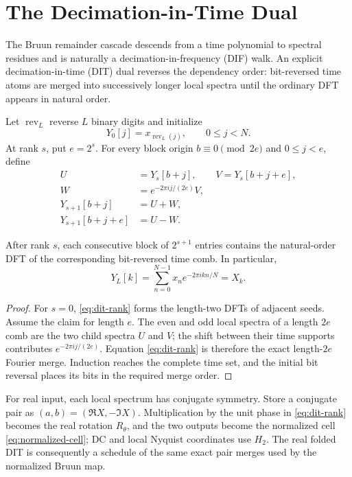 \section{The Decimation-in-Time Dual}
\label{sec:dit}

The Bruun remainder cascade descends from a time polynomial to spectral
residues and is naturally a decimation-in-frequency (DIF) walk.  An explicit
decimation-in-time (DIT) dual reverses the dependency order: bit-reversed time
atoms are merged into successively longer local spectra until the ordinary DFT
appears in natural order.

Let $\operatorname{rev}_L$ reverse $L$ binary digits and initialize
\begin{equation}
 Y_0[j]=x_{\operatorname{rev}_L(j)},\qquad0\le j<N.
 \label{eq:dit-seed}
\end{equation}
At rank $s$, put $e=2^s$.  For every block origin
$b\equiv0\pmod{2e}$ and $0\le j<e$, define
\begin{align}
 U&=Y_s[b+j],\qquad V=Y_s[b+j+e],\\
 W&=e^{-2\pi i j/(2e)}V,\nonumber\\
 Y_{s+1}[b+j]&=U+W,\\
 Y_{s+1}[b+j+e]&=U-W.
 \label{eq:dit-rank}
\end{align}

\begin{theorem}
After rank $s$, each consecutive block of $2^{s+1}$ entries contains the
natural-order DFT of the corresponding bit-reversed time comb.  In particular,
\begin{equation}
 Y_L[k]=\sum_{n=0}^{N-1}x_ne^{-2\pi ikn/N}=X_k.
 \label{eq:dit-terminal}
\end{equation}
\end{theorem}
\begin{proof}
For $s=0$, \eqref{eq:dit-rank} forms the length-two DFTs of adjacent seeds.
Assume the claim for length $e$.  The even and odd local spectra of a length
$2e$ comb are the two child spectra $U$ and $V$; the shift between their time
supports contributes $e^{-2\pi ij/(2e)}$.  Equation \eqref{eq:dit-rank} is
therefore the exact length-$2e$ Fourier merge.  Induction reaches the complete
time set, and the initial bit reversal places its bits in the required merge
order.
\end{proof}

For real input, each local spectrum has conjugate symmetry.  Store a conjugate
pair as $(a,b)=(\Re X,-\Im X)$.  Multiplication by the unit phase in
\eqref{eq:dit-rank} becomes the real rotation $R_\theta$, and the two outputs
become the normalized cell \eqref{eq:normalized-cell}; DC and local Nyquist
coordinates use $H_2$.  The real folded DIT is consequently a schedule of the
same exact pair merges used by the normalized Bruun map.

